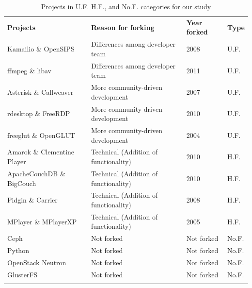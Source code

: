 \documentclass{report}
\begin{document}
\begin{table}[!ht]
\centering
\caption{Projects in U.F. H.F., and No.F. categories  for our study}
\label{forkedProjectsDataCollected}
\begin{tabular}{p{} p{} p{} p{}}
\hline\noalign{\smallskip}
\textbf{Projects} & \textbf{Reason for forking} & \textbf{Year forked} & \textbf{Type}\\
\noalign{\smallskip}\hline\noalign{\smallskip}
Kamailio \& OpenSIPS & Differences among developer team & 2008 & U.F.\\ \hline
ffmpeg \& libav & Differences among developer team & 2011 & U.F.\\ \hline
Asterisk \& Callweaver & More community-driven development & 2007 & U.F.\\ \hline
rdesktop \& FreeRDP  & More community-driven development & 2010 & U.F.\\ \hline
freeglut \& OpenGLUT & More community-driven development & 2004 & U.F.\\ \hline
Amarok \& Clementine Player & Technical (Addition of functionality) & 2010 & H.F.\\ \hline
ApacheCouchDB \& BigCouch & Technical (Addition of functionality) & 2010 & H.F.\\ \hline
Pidgin \& Carrier & Technical (Addition of functionality) & 2008 & H.F.\\ \hline
MPlayer \& MPlayerXP & Technical (Addition of functionality) & 2005 & H.F.\\ \hline
Ceph  & Not forked & Not forked & No.F.\\ \hline
Python & Not forked & Not forked & No.F.\\ \hline
OpenStack Neutron & Not forked & Not forked & No.F.\\ \hline
GlusterFS & Not forked & Not forked & No.F.\\ 
\noalign{\smallskip}\hline
\end{tabular}
\end{table}
\end{document}
